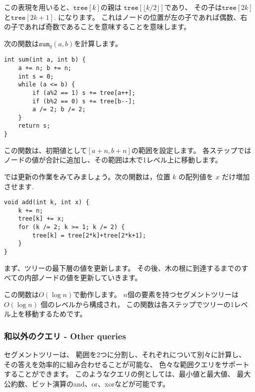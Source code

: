 この表現を用いると、$\texttt{tree}[k]$の親は 
$\texttt{tree}[\lfloor k/2 \rfloor]$であり、
その子は$\texttt{tree}[2k]$
と$\texttt{tree}[2k+1]$.
になります。
これはノードの位置が左の子であれば偶数、右の子であれば奇数であることを意味することを意味します。

次の関数は$\texttt{sum}_q(a,b)$を計算します。
\begin{lstlisting}
int sum(int a, int b) {
    a += n; b += n;
    int s = 0;
    while (a <= b) {
        if (a%2 == 1) s += tree[a++];
        if (b%2 == 0) s += tree[b--];
        a /= 2; b /= 2;
    }
    return s;
}
\end{lstlisting}
この関数は、初期値として$[a+n,b+n]$の範囲を設定します。
各ステップではノードの値が合計に追加し、その範囲は木で1レベル上に移動します。

では更新の作業をみてみましょう。次の関数は，位置 $k$ の配列値を $x$ だけ増加させます.
\begin{lstlisting}
void add(int k, int x) {
    k += n;
    tree[k] += x;
    for (k /= 2; k >= 1; k /= 2) {
        tree[k] = tree[2*k]+tree[2*k+1];
    }
}
\end{lstlisting}
まず、ツリーの最下層の値を更新します。
その後、木の根に到達するまでのすべての内部ノードの値を更新していきます。

この関数は$O(\log n)$で動作します。
$n$個の要素を持つセグメントツリーは$O(\log n)$ 個のレベルから構成され，
この関数は各ステップでツリーの1レベル上を移動するためです。

\subsubsection{和以外のクエリ - Other queries}

セグメントツリーは、
範囲を2つに分割し、それぞれについて別々に計算し、
その答えを効率的に組み合わせることが可能な、
色々な範囲クエリをサポートすることができます。
このようなクエリの例としては、最小値と最大値、 最大公約数、ビット演算のand、or、xorなどが可能です。

